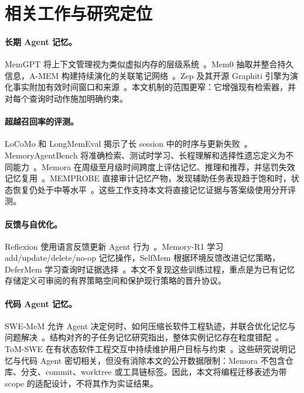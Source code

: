 \section{相关工作与研究定位}

\paragraph{长期 Agent 记忆。}
MemGPT 将上下文管理视为类似虚拟内存的层级系统~\cite{packer2023memgpt}。Mem0 抽取并整合持久信息，A-MEM 构建持续演化的关联笔记网络~\cite{chhikara2025mem0,xu2025amem}。Zep 及其开源 Graphiti 引擎为演化事实附加有效时间窗口和来源~\cite{rasmussen2025zep,graphiti2026}。本文机制的范围更窄：它增强现有检索器，并对每个查询时动作施加明确约束。

\paragraph{超越召回率的评测。}
LoCoMo 和 LongMemEval 揭示了长 session 中的时序与更新失败~\cite{maharana2024locomo,wu2024longmemeval}。MemoryAgentBench 将准确检索、测试时学习、长程理解和选择性遗忘定义为不同能力~\cite{hu2026memoryagentbench}。Memora 在周级至月级时间跨度上评估记忆、推理和推荐，并惩罚失效记忆复用~\cite{uddin2026memora}。MEMPROBE 直接审计记忆产物，发现辅助任务表现趋于饱和时，状态恢复仍处于中等水平~\cite{ma2026memprobe}。这些工作支持本文将直接记忆证据与答案级使用分开评测。

\paragraph{反馈与自优化。}
Reflexion 使用语言反馈更新 Agent 行为~\cite{shinn2023reflexion}。Memory-R1 学习 add/\allowbreak update/\allowbreak delete/\allowbreak no-op 记忆操作，SelfMem 根据环境反馈改进记忆策略，DeferMem 学习查询时证据选择~\cite{yan2025memoryr1,yang2026selfmem,yin2026defermem}。本文不复现这些训练过程，重点是为已有记忆存储定义可审阅的有界策略空间和保护现行策略的晋升协议。

\paragraph{代码 Agent 记忆。}
SWE-MeM 允许 Agent 决定何时、如何压缩长软件工程轨迹，并联合优化记忆与问题解决~\cite{gao2026swemem}。结构对齐的子任务记忆研究指出，整体实例记忆存在粒度错配~\cite{shen2026subtaskmemory}。ToM-SWE 在有状态软件工程交互中持续维护用户目标与约束~\cite{zhou2026tomswe}。这些研究说明记忆与代码 Agent 密切相关，但没有消除本文的公开数据限制：Memora 不包含仓库、分支、commit、worktree 或工具链标签。因此，本文将编程迁移表述为带 scope 的适配设计，不将其作为实证结果。

